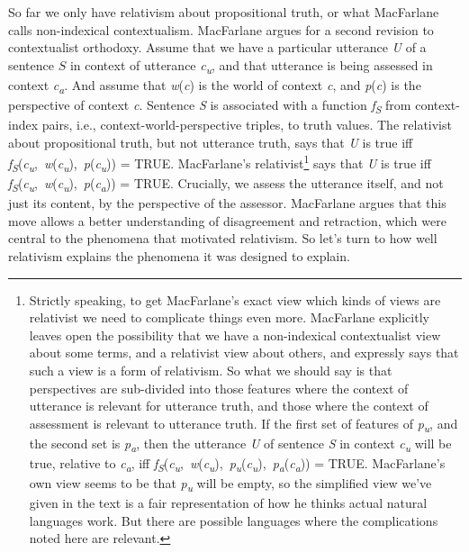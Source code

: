 \documentclass[
  11pt,
  letterpaper,
  DIV=11,
  numbers=noendperiod,
  twoside]{scrartcl}
\begin{document}
So far we only have relativism about propositional truth, or what
MacFarlane calls non-indexical contextualism. MacFarlane argues for a
second revision to contextualist orthodoxy. Assume that we have a
particular utterance \emph{U} of a sentence \(S\) in context of
utterance \emph{c\textsubscript{u}}, and that utterance is being
assessed in context \emph{c\textsubscript{a}}. And assume that
\emph{w}(\emph{c}) is the world of context \emph{c}, and
\emph{p}(\emph{c}) is the perspective of context \emph{c}. Sentence
\emph{S} is associated with a function \emph{f\textsubscript{S}} from
context-index pairs, i.e., context-world-perspective triples, to truth
values. The relativist about propositional truth, but not utterance
truth, says that \emph{U} is true iff
\emph{f\textsubscript{S}}(\emph{c\textsubscript{u}},~\emph{w}(\emph{c\textsubscript{u}}),~\emph{p}(\emph{c\textsubscript{u}}))
= TRUE. MacFarlane's relativist\footnote{Strictly speaking, to get
  MacFarlane's exact view which kinds of views are relativist we need to
  complicate things even more. MacFarlane explicitly leaves open the
  possibility that we have a non-indexical contextualist view about some
  terms, and a relativist view about others, and expressly says that
  such a view is a form of relativism. So what we should say is that
  perspectives are sub-divided into those features where the context of
  utterance is relevant for utterance truth, and those where the context
  of assessment is relevant to utterance truth. If the first set of
  features of \emph{p\textsubscript{u}}, and the second set is
  \emph{p\textsubscript{a}}, then the utterance \emph{U} of sentence
  \emph{S} in context \emph{c\textsubscript{u}} will be true, relative
  to \emph{c\textsubscript{a}}, iff
  \emph{f\textsubscript{S}}(\emph{c\textsubscript{u}},~\emph{w}(\emph{c\textsubscript{u}}),~\emph{p\textsubscript{u}}(\emph{c\textsubscript{u}}),~\emph{p\textsubscript{a}}(\emph{c\textsubscript{a}}))
  = TRUE. MacFarlane's own view seems to be that
  \emph{p\textsubscript{u}} will be empty, so the simplified view we've
  given in the text is a fair representation of how he thinks actual
  natural languages work. But there are possible languages where the
  complications noted here are relevant.} says that \emph{U} is true iff
\emph{f\textsubscript{S}}(\emph{c\textsubscript{u}},~\emph{w}(\emph{c\textsubscript{u}}),~\emph{p}(\emph{c\textsubscript{a}}))
= TRUE. Crucially, we assess the utterance itself, and not just its
content, by the perspective of the assessor. MacFarlane argues that this
move allows a better understanding of disagreement and retraction, which
were central to the phenomena that motivated relativism. So let's turn
to how well relativism explains the phenomena it was designed to
explain.
\end{document}
